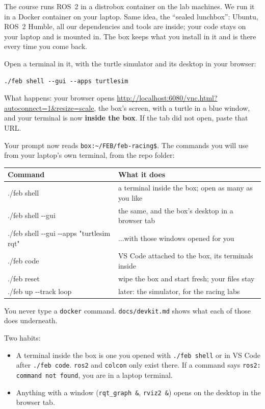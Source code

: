 \documentclass[11pt,a4paper]{article}
\begin{document}
The course runs ROS~2 in a distrobox container on the lab machines. We run it in a Docker
container on your laptop. Same idea, the ``sealed lunchbox'': Ubuntu, ROS~2 Humble, all our
dependencies and tools are inside; your code stays on your laptop and is mounted in. The box
keeps what you install in it and is there every time you come back.

Open a terminal in it, with the turtle simulator and its desktop in your browser:

\begin{lstlisting}
./feb shell --gui --apps turtlesim
\end{lstlisting}

What happens: your browser opens
\url{http://localhost:6080/vnc.html?autoconnect=1&resize=scale}, the box's screen, with a
turtle in a blue window, and your terminal is now \textbf{inside the box}. If the tab did not
open, paste that URL.

Your prompt now reads \texttt{box:\textasciitilde/FEB/feb-racing\$}. The commands you will use
from your laptop's own terminal, from the repo folder:

\noindent\begin{tabularx}{\linewidth}{>{\ttfamily\small}p{7.3cm}X}
\toprule
\normalfont Command & What it does \\
\midrule
./feb shell & a terminal inside the box; open as many as you like \\
./feb shell -{}-gui & the same, and the box's desktop in a browser tab \\
./feb shell -{}-gui -{}-apps "turtlesim rqt" & ...with those windows opened for you \\
./feb code & VS Code attached to the box, its terminals inside \\
./feb reset & wipe the box and start fresh; your files stay \\
./feb up -{}-track loop & later: the simulator, for the racing labs \\
\bottomrule
\end{tabularx}

\smallskip
You never type a \texttt{docker} command. \texttt{docs/devkit.md} shows what each of those does
underneath.

Two habits:
\begin{itemize}
  \item A terminal inside the box is one you opened with \texttt{./feb shell} or in VS Code after
  \texttt{./feb code}. \texttt{ros2} and \texttt{colcon} only exist there. If a command says
  \texttt{ros2: command not found}, you are in a laptop terminal.
  \item Anything with a window (\texttt{rqt\_graph \&}, \texttt{rviz2 \&}) opens on the desktop in
  the browser tab.
\end{itemize}
\end{document}
